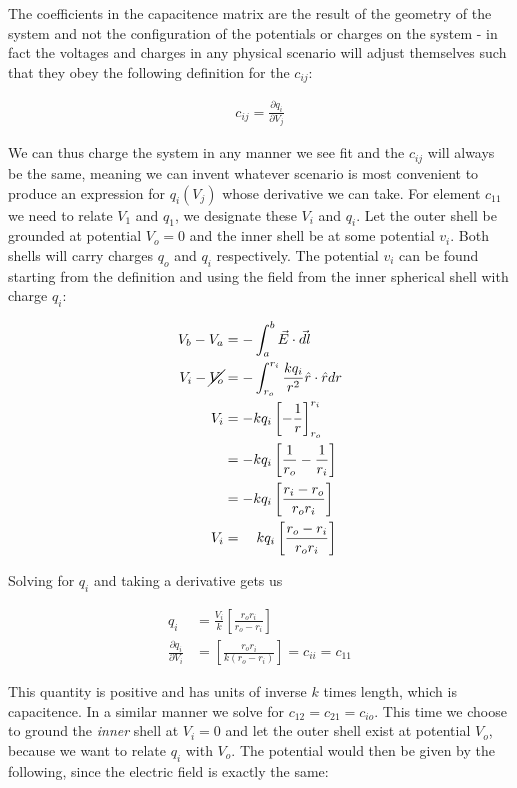 \documentclass[paper=a4, fontsize=11pt]{scrartcl} %
\numberwithin{equation}{section} %
\numberwithin{figure}{section} %
\numberwithin{table}{section} %
\begin{document}
The coefficients in the capacitence matrix are the result of the geometry of the system and not the configuration of the potentials or charges on the system - in fact the voltages and charges in any physical scenario will adjust themselves such that they obey the following definition for the $c_{ij}$:

\begin{align}
c_{ij} = \frac{\partial q_i}{\partial V_j}
\end{align} 

We can thus charge the system in any manner we see fit and the $c_{ij}$ will always be the same, meaning we can invent whatever scenario is most convenient to produce an expression for $q_i(V_j)$ whose derivative we can take. For element $c_{11}$ we need to relate $V_1$ and $q_1$, we designate these $V_i$ and $q_i$.  Let the outer shell be grounded at potential $V_o = 0$ and the inner shell be at some potential $v_i$. Both shells will carry charges $q_o$ and $q_i$ respectively. The potential $v_i$ can be found starting from the definition and using the field from the inner spherical shell with charge $q_i$:

\begin{align}
V_b - V_a &= -\int_a^b \vec{E}\cdot\vec{dl} \\ 
V_i - \cancel{V_o} &= -\int_{r_o}^{r_i} \frac{k q_i}{r^2}\hat{r}\cdot\hat{r}dr \\
V_i &= - k q_i \left[ - \frac{1}{r}\right]_{r_o}^{r_i} \\
&= - k q_i \left[\frac{1}{r_o} - \frac{1}{r_i}\right] \\
&= - k q_i \left[\frac{r_i - r_o}{r_o r_i}\right] \\
V_i &= \ \ \ k q_i \left[\frac{r_o - r_i}{r_o r_i} \right]
\end{align} 

Solving for $q_i$ and taking a derivative gets us 

\begin{align}
q_i &= \frac{V_i}{k} \left[\frac{r_o r_i}{r_o - r_i}\right] \\
\frac{\partial q_i}{\partial V_i} &= \left[\frac{r_o r_i}{k\left(r_o - r_i\right)}\right] = c_{ii} = c_{11}
\end{align}

This quantity is positive and has units of inverse $k$ times length, which is capacitence. In a similar manner we solve for $c_{12} = c_{21} = c_{io}$. This time we choose to ground the \textit{inner} shell at $V_i = 0$ and let the outer shell exist at potential $V_o$, because we want to relate $q_i$ with $V_o$. The potential would then be given by the following, since the electric field is exactly the same: 
\end{document}
